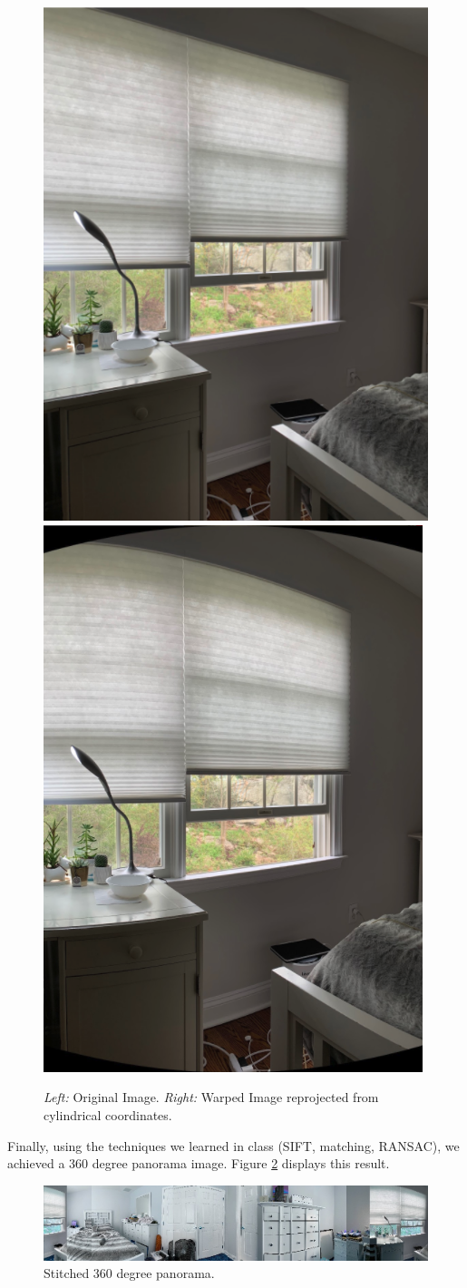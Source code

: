 \documentclass[10pt,twocolumn,letterpaper]{article}
\begin{document}
\pagebreak

\begin{figure}[h]
    \centering
    \includegraphics[width=0.5\linewidth]{noncylindrical.png}
    \includegraphics[width=0.465\linewidth]{cylindrical.png}
    \caption{\emph{Left:} Original Image. \emph{Right:} Warped Image reprojected from cylindrical coordinates.}
    \label{fig:result2}
\end{figure}

Finally, using the techniques we learned in class (SIFT, matching, RANSAC), we achieved a 360 degree panorama image. Figure \ref{fig:result3} displays this result.
\begin{figure}[h]
\centering
 \includegraphics[width=\linewidth]{pano5.jpg}
\caption{Stitched 360 degree panorama. }
\label{fig:result3}
\end{figure}
\end{document}
